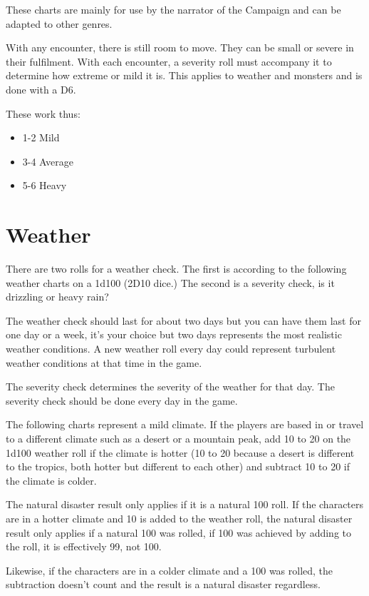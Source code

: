 These charts are mainly for use by the narrator of the Campaign and can be adapted to other genres.

With any encounter, there is still room to move. They can be small or severe in their fulfilment. With each encounter, a severity roll must accompany it to determine how extreme or mild it is. This applies to weather and monsters and is done with a D6.

These work thus:

\begin{itemize}
    \item 1-2 Mild
    \item 3-4 Average
    \item 5-6 Heavy
\end{itemize}

\section{Weather}

There are two rolls for a weather check. The first is according to the following weather charts on a 1d100 (2D10 dice.) The second is a severity check, is it drizzling or heavy rain?

The weather check should last for about two days but you can have them last for one day or a week, it’s your choice but two days represents the most realistic weather conditions. A new weather roll every day could represent turbulent weather conditions at that time in the game.

The severity check determines the severity of the weather for that day. The severity check should be done every day in the game.

The following charts represent a mild climate. If the players are based in or travel to a different climate such as a desert or a mountain peak, add 10 to 20 on the 1d100 weather roll if the climate is hotter (10 to 20 because a desert is different to the tropics, both hotter but different to each other) and subtract 10 to 20 if the climate is colder.

The natural disaster result only applies if it is a natural 100 roll. If the characters are in a hotter climate and 10 is added to the weather roll, the natural disaster result only applies if a natural 100 was rolled, if 100 was achieved by adding to the roll, it is effectively 99, not 100.

Likewise, if the characters are in a colder climate and a 100 was rolled, the subtraction doesn’t count and the result is a natural disaster regardless.


